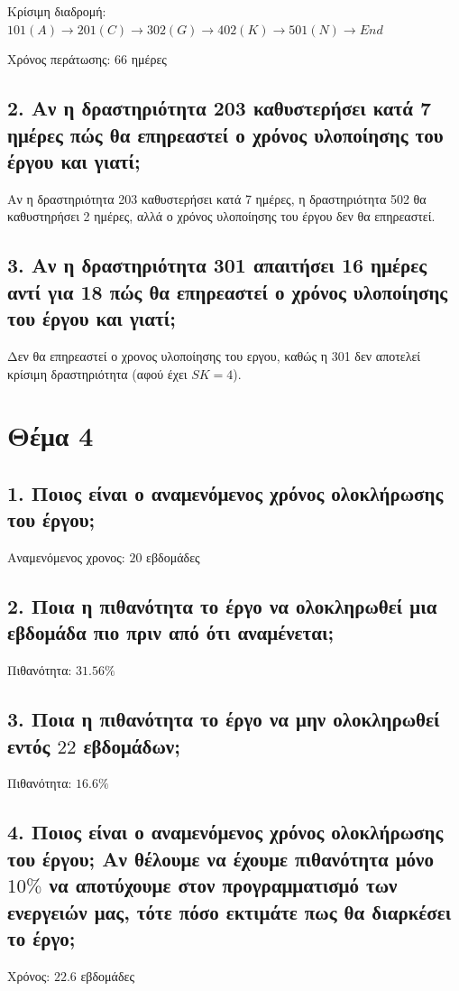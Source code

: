 \documentclass[12pt]{turabian-researchpaper}
\begin{document}
Κρίσιμη διαδρομή: $101 (A) \rightarrow  201 (C) \rightarrow 302(G) \rightarrow 402 (K) \rightarrow 501 (N) \rightarrow End$

Χρόνος περάτωσης: $66$ ημέρες

\subsection{2. Αν η δραστηριότητα 203 καθυστερήσει κατά 7 ημέρες πώς θα επηρεαστεί ο χρόνος υλοποίησης του έργου και γιατί;}

Αν η δραστηριότητα 203 καθυστερήσει κατά 7 ημέρες, η δραστηριότητα 502 θα καθυστηρήσει 2 ημέρες, αλλά ο χρόνος υλοποίησης του έργου δεν θα επηρεαστεί.

\subsection{3. Αν η δραστηριότητα 301 απαιτήσει 16 ημέρες αντί για 18 πώς θα επηρεαστεί ο χρόνος υλοποίησης του έργου και γιατί;}

Δεν θα επηρεαστεί ο χρονος υλοποίησης του εργου, καθώς η 301 δεν αποτελεί κρίσιμη δραστηριότητα (αφού έχει $SK = 4$).

\section{Θέμα 4}

\subsection*{1. Ποιος είναι ο αναμενόμενος χρόνος ολοκλήρωσης του έργου;}
Αναμενόμενος χρονος: $20$ εβδομάδες

\subsection{2. Ποια η πιθανότητα το έργο να ολοκληρωθεί μια εβδομάδα πιο πριν από ότι αναμένεται;}
Πιθανότητα: $31.56\%$

\subsection{3. Ποια η πιθανότητα το έργο να μην ολοκληρωθεί εντός $22$ εβδομάδων;}
Πιθανότητα: $16.6\%$

\subsection{4. Ποιος είναι ο αναμενόμενος χρόνος ολοκλήρωσης του έργου; Αν θέλουμε να έχουμε πιθανότητα μόνο $10\%$ να αποτύχουμε στον προγραμματισμό των ενεργειών μας, τότε πόσο εκτιμάτε πως θα διαρκέσει το έργο;}
Χρόνος: $22.6$ εβδομάδες
\end{document}
